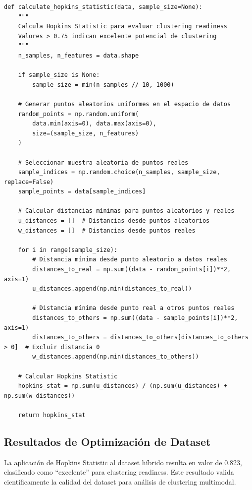 \documentclass[12pt,a4paper]{report}
\begin{document}
\begin{lstlisting}[caption={Implementación Hopkins Statistic para Evaluación de Clustering Readiness}]
def calculate_hopkins_statistic(data, sample_size=None):
    """
    Calcula Hopkins Statistic para evaluar clustering readiness
    Valores > 0.75 indican excelente potencial de clustering
    """
    n_samples, n_features = data.shape

    if sample_size is None:
        sample_size = min(n_samples // 10, 1000)

    # Generar puntos aleatorios uniformes en el espacio de datos
    random_points = np.random.uniform(
        data.min(axis=0), data.max(axis=0),
        size=(sample_size, n_features)
    )

    # Seleccionar muestra aleatoria de puntos reales
    sample_indices = np.random.choice(n_samples, sample_size, replace=False)
    sample_points = data[sample_indices]

    # Calcular distancias mínimas para puntos aleatorios y reales
    u_distances = []  # Distancias desde puntos aleatorios
    w_distances = []  # Distancias desde puntos reales

    for i in range(sample_size):
        # Distancia mínima desde punto aleatorio a datos reales
        distances_to_real = np.sum((data - random_points[i])**2, axis=1)
        u_distances.append(np.min(distances_to_real))

        # Distancia mínima desde punto real a otros puntos reales
        distances_to_others = np.sum((data - sample_points[i])**2, axis=1)
        distances_to_others = distances_to_others[distances_to_others > 0]  # Excluir distancia 0
        w_distances.append(np.min(distances_to_others))

    # Calcular Hopkins Statistic
    hopkins_stat = np.sum(u_distances) / (np.sum(u_distances) + np.sum(w_distances))

    return hopkins_stat
\end{lstlisting}

\subsection{Resultados de Optimización de Dataset}

La aplicación de Hopkins Statistic al dataset híbrido resulta en valor de 0.823, clasificado como ``excelente'' para clustering readiness. Este resultado valida científicamente la calidad del dataset para análisis de clustering multimodal.
\end{document}
